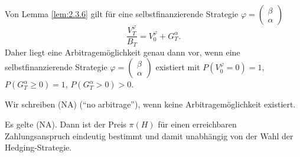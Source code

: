 \documentclass[a4paper,twoside,DIV15,BCOR12mm]{scrbook}
\begin{document}
\begin{bemerkung}
Von Lemma \ref{lem:2.3.6} gilt für eine selbstfinanzierende Strategie $\varphi = 
\left(\begin{smallmatrix} \beta \\ \alpha \end{smallmatrix}\right)$
\[
\frac{V_T^\varphi}{B_{T}} = V_0^\varphi + G_T^\alpha.
\]
Daher liegt eine Arbitragemöglichkeit genau dann vor, wenn eine selbstfinanzierende Strategie \mbox{$\varphi = 
\left(\begin{smallmatrix} \beta \\ \alpha \end{smallmatrix}\right)$} existiert mit $P(V_0^\varphi = 0) = 1$, $P(G_T^\alpha \ge 0) = 1$, $P(G_T^\alpha>0)>0$.
\end{bemerkung}

\begin{bemerkung}
Wir schreiben (NA) (“no arbitrage”), wenn keine Arbitragemöglichkeit existiert.
\end{bemerkung}

\begin{lemma}
Es gelte (NA). Dann ist der Preis $\pi(H)$ für einen erreichbaren Zahlungsanspruch eindeutig bestimmt und damit unabhängig von der Wahl der Hedging-Strategie.\label{lem:2.3.15}
\end{lemma}
\end{document}
